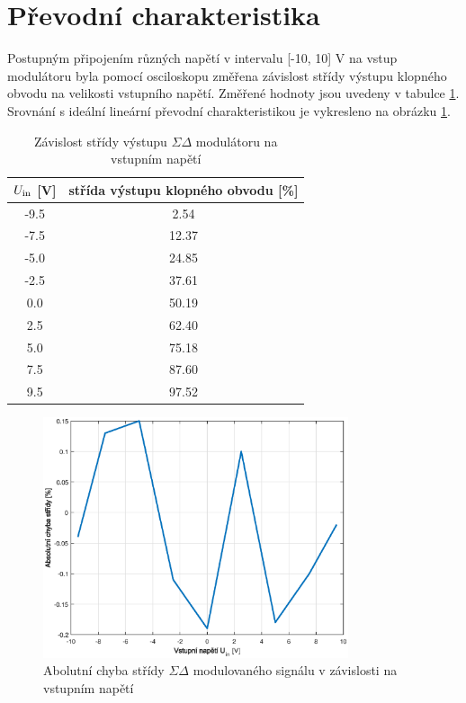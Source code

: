 \documentclass[twoside]{article}
\begin{document}
\section{Převodní charakteristika}

Postupným připojením různých napětí v intervalu [-10, 10] V na vstup
modulátoru byla pomocí osciloskopu změřena závislost střídy výstupu
klopného obvodu na velikosti vstupního napětí. Změřené hodnoty jsou
uvedeny v tabulce \ref{tab:dc-sweep}. Srovnání s 
ideální lineární převodní charakteristikou je vykresleno na
obrázku \ref{chyba}.

\begin{table}[h]
    \centering
    \begin{tabular}{c|c}
        $U_{\rm in}$ [V] & střída výstupu klopného obvodu [\%] \\ \hline
        -9.5 & 2.54\\
        -7.5 & 12.37\\
        -5.0 & 24.85\\
        -2.5 & 37.61\\
        0.0 &  50.19\\
        2.5 & 62.40\\
        5.0 & 75.18 \\
        7.5 & 87.60\\
        9.5 & 97.52\\
    \end{tabular}
    \caption{Závislost střídy výstupu $\Sigma\Delta$ modulátoru na vstupním napětí}
    \label{tab:dc-sweep}
\end{table}

\begin{figure}[h]
    \centering
    \includegraphics[width=0.8\textwidth]{chyba_prevodu.eps}
    \caption{Abolutní chyba střídy $\Sigma\Delta$ modulovaného signálu
    v závislosti na vstupním napětí}
    \label{chyba}
\end{figure}
\clearpage
\end{document}
